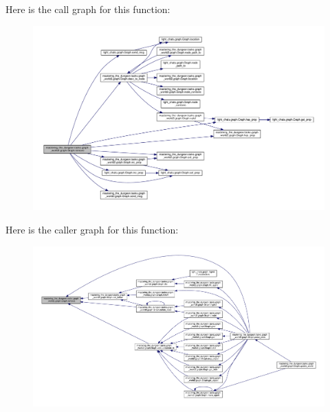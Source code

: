 Here is the call graph for this function\+:
\nopagebreak
\begin{figure}[H]
\begin{center}
\leavevmode
\includegraphics[width=350pt]{classmastering__the__dungeon_1_1tasks_1_1graph__world2_1_1graph_1_1Graph_ad7707b274f24d19b9e910544b2b8023b_cgraph}
\end{center}
\end{figure}
Here is the caller graph for this function\+:
\nopagebreak
\begin{figure}[H]
\begin{center}
\leavevmode
\includegraphics[width=350pt]{classmastering__the__dungeon_1_1tasks_1_1graph__world2_1_1graph_1_1Graph_ad7707b274f24d19b9e910544b2b8023b_icgraph}
\end{center}
\end{figure}
\mbox{\label{classmastering__the__dungeon_1_1tasks_1_1graph__world2_1_1graph_1_1Graph_aaa7e8c07a96b32ac6cfa2f06b5f1772a}} 
